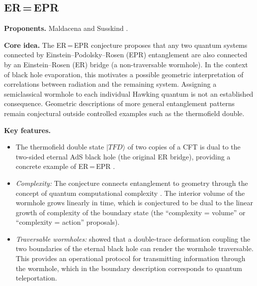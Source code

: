 \documentclass[11pt,letterpaper]{article}
\theoremstyle{plain}
\theoremstyle{definition}
\theoremstyle{remark}
\begin{document}
\subsection{\texorpdfstring{ER\,=\,EPR}{ER=EPR}}
\label{app:erepr}

\textbf{Proponents.}  Maldacena and Susskind \cite{maldacenasusskind2013}.

\medskip
\noindent
\textbf{Core idea.}  The ER\,=\,EPR conjecture proposes that any two
quantum systems connected by Einstein--Podolsky--Rosen (EPR) entanglement are
also connected by an Einstein--Rosen (ER) bridge (a non-traversable wormhole).
In the context of black hole evaporation, this motivates a possible geometric interpretation of correlations between
radiation and the remaining system.  Assigning a semiclassical wormhole to
each individual Hawking quantum is not an established consequence.  Geometric descriptions of more general entanglement patterns remain
conjectural outside controlled examples such as the thermofield double.

\medskip
\noindent
\textbf{Key features.}
\begin{itemize}
  \item The thermofield double state $|TFD\rangle$ of two copies of a CFT
    is dual to the two-sided eternal AdS black hole (the original ER bridge),
    providing a concrete example of ER\,=\,EPR \cite{maldacena2003}.
  \item \emph{Complexity:}  The conjecture connects entanglement to geometry
    through the concept of quantum computational complexity
    \citep{stanfordsusskind2014}.  The interior
    volume of the wormhole grows linearly in time, which is conjectured to
    be dual to the linear growth of complexity of the boundary state
    (the ``complexity = volume'' or ``complexity = action'' proposals).
  \item \emph{Traversable wormholes:}  \citet{gaoetal2017} showed that a
    double-trace deformation coupling the two boundaries of the eternal
    black hole can render the wormhole traversable.  This provides an
    operational protocol for transmitting information through the wormhole,
    which in the boundary description corresponds to quantum teleportation.
\end{itemize}
\end{document}
